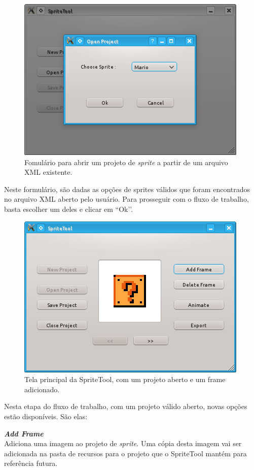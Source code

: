 \documentclass[brazil]{abnt}
\begin{document}
\begin{figure}[H]
\centering
\includegraphics{imgs/spritetool5.png}
\caption{Fomulário para abrir um projeto de \textit{sprite} a partir de um arquivo XML existente.}
\end{figure}

Neste formulário, são dadas as opções de sprites válidos que foram encontrados no arquivo XML aberto pelo usuário. Para prosseguir com o fluxo de trabalho, basta escolher um deles e clicar em ``Ok’’.

\begin{figure}[H]
\centering
\includegraphics{imgs/spritetool3.png}
\caption{Tela principal da SpriteTool, com um projeto aberto e um frame adicionado.}
\end{figure}

Nesta etapa do fluxo de trabalho, com um projeto válido aberto, novas opções estão disponíveis. São elas:

\textbf{\textit{Add Frame}}\\
Adiciona uma imagem ao projeto de \textit{sprite}. Uma cópia desta imagem vai ser adicionada na pasta de recursos para o projeto que o SpriteTool mantém para referência futura.
\end{document}
